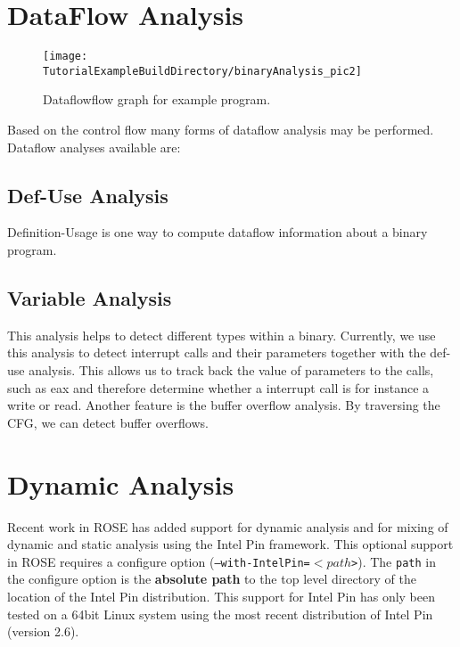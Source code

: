 \section{DataFlow Analysis}

\begin{figure}
\texttt{[image: \\TutorialExampleBuildDirectory/binaryAnalysis\_pic2]}
\caption{Dataflowflow graph for example program.}
\label{Tutorial:examplefig2}
\end{figure}

Based on the control flow many forms of dataflow analysis may be performed.
Dataflow analyses available are:
 
\subsection{Def-Use Analysis}

Definition-Usage is one way to compute dataflow information about a binary program.

\subsection{Variable Analysis}

This analysis helps to detect different types within a binary.
Currently, we use this analysis to detect interrupt calls and their parameters together with the def-use analysis.
This allows us to track back the value of parameters to the calls, such as eax and therefore 
determine whether a interrupt call is for instance a write or read.
Another feature is the buffer overflow analysis. By traversing the CFG, we can detect buffer overflows.


\section{Dynamic Analysis}

   Recent work in ROSE has added support for dynamic analysis and for mixing of dynamic
and static analysis using the Intel Pin framework. This optional support in ROSE
requires a configure option ({\tt --with-IntelPin=$<path$>}).  The {\tt path} in
the configure option is the {\bf absolute path} to the top level directory of the location of
the Intel Pin distribution.  This support for Intel Pin has only been tested
on a 64bit Linux system using the most recent distribution of Intel Pin (version 2.6).

